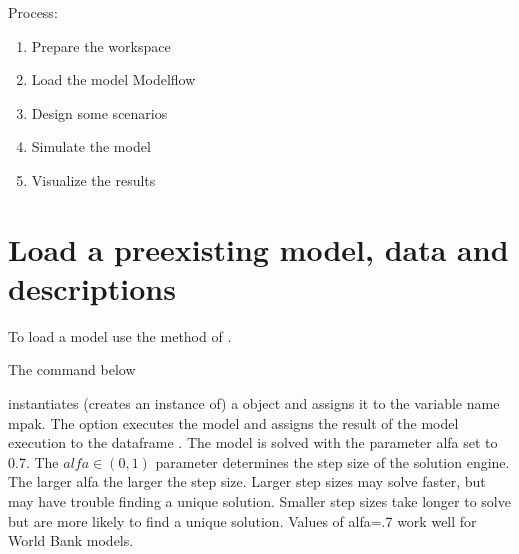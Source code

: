 \documentclass[letterpaper,10pt,english]{jupyterBook}
\begin{document}
\sphinxAtStartPar
Process:
\begin{enumerate}
%
\item {} 
\sphinxAtStartPar
Prepare the workspace

\item {} 
\sphinxAtStartPar
Load the model Modelflow

\item {} 
\sphinxAtStartPar
Design some scenarios

\item {} 
\sphinxAtStartPar
Simulate the model

\item {} 
\sphinxAtStartPar
Visualize the results

\end{enumerate}


\section{Load a pre\sphinxhyphen{}existing model, data and descriptions}
\label{\detokenize{content/05_WBModels/LoadingWBModel:load-a-pre-existing-model-data-and-descriptions}}
\sphinxAtStartPar
To load a model use the  method of .

\sphinxAtStartPar
The command below

\begin{sphinxVerbatim}[commandchars=\\\{\}]
    
\end{sphinxVerbatim}

\sphinxAtStartPar
instantiates (creates an instance of) a  object and assigns it to the variable name mpak.  The  option executes the model and assigns the result of the model execution to the dataframe .  The model is solved with the parameter alfa set to 0.7.  The \(alfa \in (0,1)\) parameter determines the step size of the solution engine. The larger alfa the larger the step size. Larger step sizes may solve faster, but may have trouble finding a unique solution.  Smaller step sizes take longer to solve but are more likely to find a unique solution.  Values of alfa=.7 work well for World Bank models.
\end{document}
